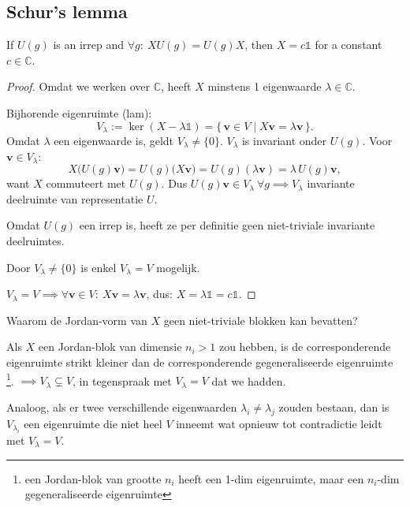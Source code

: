

\subsection{Schur's lemma}

\begin{theorem}
    If \(U(g)\) is an irrep and \(\forall g : \ XU(g) = U(g)X\), then \(X = c \mathds{1}\) for a constant \(c \in \mathbb{C}\). 
\end{theorem}

\begin{proof}
    Omdat we werken over \(\mathbb{C}\), heeft \(X\) minstens 1 eigenwaarde \(\lambda \in \mathbb{C}\). 
    
    Bijhorende eigenruimte (lam):
    \[
        V_\lambda := \ker(X - \lambda\mathds{1}) = \{\, \bm v \in V \mid X \bm v = \lambda \bm v \,\}.
    \]
    Omdat \(\lambda\) een eigenwaarde is, geldt \(V_\lambda \neq \{0\}\).
    \(V_\lambda\) is invariant onder \(U(g)\). Voor \(\bm v \in V_\lambda\):
    \[
        X\big(U(g) \bm v\big) = U(g)\big(X \bm v\big) = U(g)(\lambda \bm v) = \lambda\, U(g) \bm v,
    \]
    want \(X\) commuteert met \(U(g)\). Dus \(U(g) \bm v \in V_\lambda \ \forall g \implies V_\lambda\) invariante deelruimte van representatie \(U\).

    Omdat \(U(g)\) een irrep is, heeft ze per definitie geen niet-triviale invariante deelruimtes.
    
    Door \(V_\lambda \neq \{0\}\) is enkel \( V_\lambda = V \) mogelijk.

  \(V_\lambda = V \implies \forall \bm v \in V: \ X \bm v = \lambda \bm v\), dus:
    \(
        X = \lambda \mathds{1}  = c \mathds{1}
    \).
\end{proof}

 Waarom de Jordan-vorm van \(X\) geen niet-triviale blokken kan bevatten?
 
 Als \(X\) een Jordan-blok van dimensie \(n_i>1\) zou hebben,
 is de corresponderende eigenruimte strikt kleiner dan de corresponderende gegeneraliseerde eigenruimte \footnote{een Jordan-blok van grootte \(n_i\) heeft een 1-dim eigenruimte,
 maar een \(n_i\)-dim gegeneraliseerde eigenruimte}.  \(\implies V_\lambda \subsetneq V\), in tegenspraak met \(V_\lambda = V\) dat we hadden.

 Analoog, als er twee verschillende eigenwaarden \(\lambda_i \neq \lambda_j\) zouden bestaan, dan is \(V_{\lambda_i}\) een eigenruimte die niet heel \(V\) inneemt wat opnieuw tot contradictie leidt met \(V_\lambda = V\).


